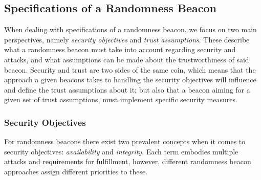 \subsection{Specifications of a Randomness Beacon}
When dealing with specifications of a randomness beacon, we focus on two main perspectives, namely \emph{security objectives} and \emph{trust assumptions}.
These describe what a randomness beacon must take into account regarding security and attacks, and what assumptions can be made about the trustworthiness of said beacon.
Security and trust are two sides of the same coin, which means that the approach a given beacons takes to handling the security objectives will influence and define the trust assumptions about it;
but also that a beacon aiming for a given set of trust assumptions, must implement specific security measures.
\subsubsection{Security Objectives}\label{ssub:security_objectives}
For randomness beacons there exist two prevalent concepts when it comes to security objectives: \emph{availability} and \emph{integrity}.
Each term embodies multiple attacks and requirements for fulfillment, however, different randomness beacon approaches assign different priorities to these.

